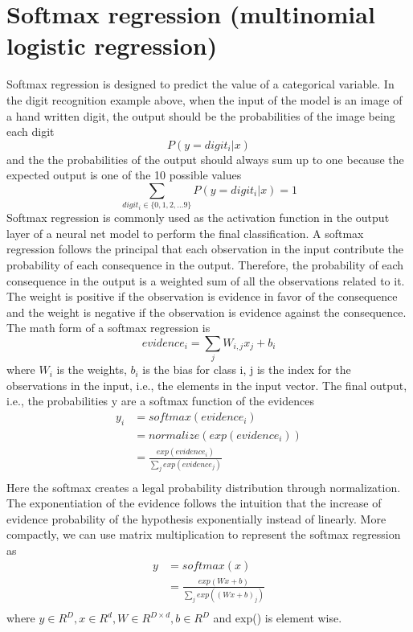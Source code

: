 \documentclass[12pt]{WSUThesis}
\theoremstyle{definition}
\begin{document}
\section{Softmax regression (multinomial logistic regression)}
Softmax regression is designed to predict the value of a categorical variable.
In the digit recognition example above, when the input of the model is an image of a hand written digit, the output should be the probabilities of the image being each digit
\[P(y = digit_i | x)\]
and the the probabilities of the output should always sum up to one because the expected output is one of the 10 possible values
\[ \sum_{digit_i \in \{0, 1, 2, ... 9\}}P(y = digit_i | x) = 1 \]
Softmax regression is commonly used as the activation function in the output layer of a neural net model to perform the final classification.
A softmax regression follows the principal that each observation in the input contribute the probability of each consequence in the output. Therefore, the probability of each consequence in the output is a weighted sum of all the observations related to it. The weight is positive if the observation is evidence in favor of the consequence and the weight is negative if the observation is evidence against the consequence.
The math form of a softmax regression is
\[ evidence_i = \sum_j W_{i, j} x_j + b_i \]
where $ W_i $ is the weights, $ b_i $ is the bias for class i, j is the index for the observations in the input, i.e., the elements in the input vector.
The final output, i.e., the probabilities y are a softmax function of the evidences
\begin{align*}
	y_i
	&= softmax(evidence_i) \\
	&= normalize(exp(evidence_i)) \\
	&= \frac{exp(evidence_i)}{\sum_j exp(evidence_j)} \\
\end{align*}
Here the softmax creates a legal probability distribution through normalization. The exponentiation of the evidence follows the intuition that the increase of evidence probability of the hypothesis exponentially instead of linearly.
More compactly, we can use matrix multiplication to represent the softmax regression as
\begin{align*}
	y
	&= softmax(x) \\
	&= \frac{exp(Wx + b)}{\sum_j exp((Wx + b)_j)} \\
\end{align*}
where $ y \in R^D, x \in R^d, W \in R^{D \times d}, b \in R^D $ and exp() is element wise.
\end{document}
